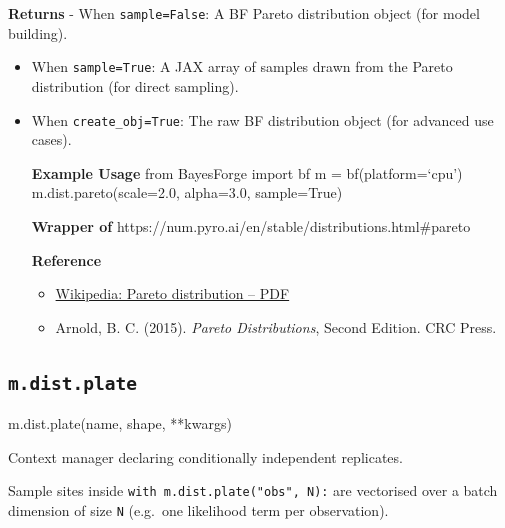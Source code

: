\documentclass[
  letterpaper,
  DIV=11,
  numbers=noendperiod]{scrartcl}
\newenvironment{Shaded}{\begin{snugshade}}{\end{snugshade}}
\newcommand{\NormalTok}[1]{\textcolor[rgb]{0.00,0.23,0.31}{#1}}
\newcommand{\OperatorTok}[1]{\textcolor[rgb]{0.37,0.37,0.37}{#1}}
\providecommand{\tightlist}{%
  \setlength{\itemsep}{0pt}\setlength{\parskip}{0pt}}\usepackage{longtable,booktabs,array}
\begin{document}
\textbf{Returns} - When \texttt{sample=False}: A BF Pareto distribution
object (for model building).

\begin{itemize}
\item
  When \texttt{sample=True}: A JAX array of samples drawn from the
  Pareto distribution (for direct sampling).
\item
  When \texttt{create\_obj=True}: The raw BF distribution object (for
  advanced use cases).

  \textbf{Example Usage} from BayesForge import bf m =
  bf(platform=`cpu') m.dist.pareto(scale=2.0, alpha=3.0, sample=True)

  \textbf{Wrapper of}
  https://num.pyro.ai/en/stable/distributions.html\#pareto

  \textbf{Reference}

  \begin{itemize}
  \tightlist
  \item
    \href{https://en.wikipedia.org/wiki/Pareto_distribution\#Probability_density_function}{Wikipedia:
    Pareto distribution -- PDF}
  \item
    Arnold, B. C. (2015). \emph{Pareto Distributions}, Second Edition.
    CRC Press.
  \end{itemize}
\end{itemize}

\subsection{\texorpdfstring{\texttt{m.dist.plate}}{m.dist.plate}}\label{plate}

\begin{Shaded}
\begin{Highlighting}[]
\NormalTok{m.dist.plate(name, shape, }\OperatorTok{**}\NormalTok{kwargs)}
\end{Highlighting}
\end{Shaded}

Context manager declaring conditionally independent replicates.

Sample sites inside \texttt{with\ m.dist.plate("obs",\ N):} are
vectorised over a batch dimension of size \texttt{N} (e.g.~one
likelihood term per observation).
\end{document}
